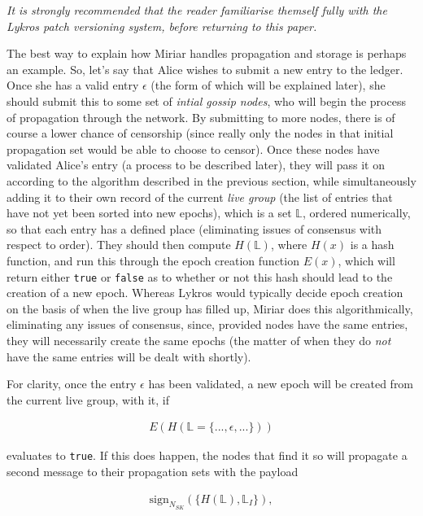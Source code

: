 \documentclass{extreport}
\begin{document}
\emph{It is strongly recommended that the reader familiarise themself fully with the Lykros patch versioning system, before returning to this paper.}

The best way to explain how Miriar handles propagation and storage is perhaps an example. So, let's say that Alice wishes to submit a new entry to the ledger. Once she has a valid entry \(\epsilon\) (the form of which will be explained later), she should submit this to some set of \emph{intial gossip nodes}, who will begin the process of propagation through the network. By submitting to more nodes, there is of course a lower chance of censorship (since really only the nodes in that initial propagation set would be able to choose to censor). Once these nodes have validated Alice's entry (a process to be described later), they will pass it on according to the algorithm described in the previous section, while simultaneously adding it to their own record of the current \emph{live group} (the list of entries that have not yet been sorted into new epochs), which is a set \(\mathbb{L}\), ordered numerically, so that each entry has a defined place (eliminating issues of consensus with respect to order). They should then compute \(H(\mathbb{L})\), where \(H(x)\) is a hash function, and run this through the epoch creation function \(E(x)\), which will return either \texttt{true} or \texttt{false} as to whether or not this hash should lead to the creation of a new epoch. Whereas Lykros would typically decide epoch creation on the basis of when the live group has filled up, Miriar does this algorithmically, eliminating any issues of consensus, since, provided nodes have the same entries, they will necessarily create the same epochs (the matter of when they do \emph{not} have the same entries will be dealt with shortly).

For clarity, once the entry \(\epsilon\) has been validated, a new epoch will be created from the current live group, with it, if

\begin{align*}
E( H( \mathbb{L} = \{ ..., \epsilon, ... \} ) ) \tag{3.1}
\end{align*}

evaluates to \texttt{true}. If this does happen, the nodes that find it so will propagate a second message to their propagation sets with the payload

\begin{align*}
\mathrm{sign}_{N_{SK}}(\{ H(\mathbb{L}), \mathbb{L}_I \}), \tag{3.2}
\end{align*}
\end{document}
